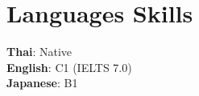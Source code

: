 \documentclass[letterpaper,11pt]{article}
\begin{document}
\section{Languages Skills}
 \begin{itemize}[leftmargin=0.15in, label={}]
    \small{\item{
     \textbf{Thai}{: Native} \\
     \textbf{English}{: C1 (IELTS 7.0)} \\
     \textbf{Japanese}{: B1}
    }}
 \end{itemize}


\end{document}
